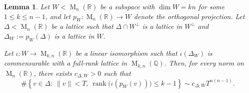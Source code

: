 \documentclass[reqno,11pt]{amsart}
\numberwithin{equation}{section}
\newtheorem{lemma}[theorem]{Lemma}
\theoremstyle{definition}
\theoremstyle{remark}
\newcommand{\op}{\operatorname}
\newcommand{\rank}{\op{rank}}
\newcommand{\M}{\op{M}}
\begin{document}
\begin{lemma}
\label{lem:fibered-rank-count}
Let $W<\M_n(\mathbb R)$ be a subspace with
$\dim W=kn$ for some $1\le k\le n-1$, and let
$p_W:\M_n(\mathbb R)\to W$ denote the orthogonal projection. Let
$\Delta<\M_n(\mathbb R)$ be a lattice such that
$\Delta\cap W^\perp$ is a lattice in $W^\perp$ and
$\Delta_W:=p_W(\Delta)$ is a lattice in $W$.

Let $\iota:W\to\M_{k,n}(\mathbb R)$ be a linear isomorphism such that
$\iota(\Delta_W)$ is commensurable with a full-rank lattice in
$\M_{k,n}(\mathbb Q)$. Then, for every norm on $\M_n(\mathbb R)$,
there exists $c_{\Delta,W}>0$ such that
$$
\#\left\{
v\in\Delta:\ \|v\|<T,\
\rank\bigl(\iota(p_W(v))\bigr)\le k-1
\right\}
\sim
c_{\Delta,W}T^{n(n-1)}.
$$
\end{lemma}
\end{document}
